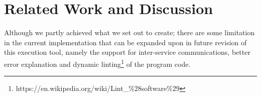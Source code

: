 \documentclass[12pt]{article}
\begin{document}
\section{Related Work and Discussion}

Although we partly achieved what we set out to create; there are some limitation in the current implementation that can be expanded upon in future revision of this execution tool, namely the support for inter-service communications, better error explanation and dynamic linting\footnote{https://en.wikipedia.org/wiki/Lint\_\%28software\%29} of the program code.
\end{document}
